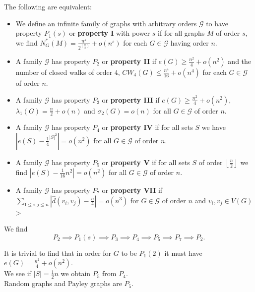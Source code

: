 \begin{definition}
	The following are equivalent:
	\begin{itemize}
		\item We define an infinite family of graphs with arbitrary orders \(\mathscr{G}\) to have property \(P_1\left( s \right) \) or  \textbf{property I} with power \(s\) if for all graphs \(M\) of order \(s\), we find \(N_{G}^{*}\left( M \right) = \frac{n^{s}}{2^{\binom{n}{2}}} + o\left( n^{s} \right) \) for each \(G \in \mathscr{G}\) having order \(n\).
		\item A family \(\mathscr{G}\) has property \(P_2\) or \textbf{property II} if \(e\left( G \right)  \ge \frac{n^2}{4} + o\left( n^2 \right) \) and the number of closed walks of order \(4\), \(CW_4 \left( G \right) \le \frac{n^{4}}{16}+ o\left( n^{4} \right) \) for each \(G \in \mathscr{G}\) of order \(n\).
		\item A family \(\mathscr{G}\) has property \(P_3\) or \textbf{property III} if \(e\left( G \right)  \ge \frac{n^2}{4} + o\left( n^2 \right) \), \(\lambda_1\left( G \right) = \frac{n}{2} + o\left( n \right) \) and \(\sigma_2\left( G \right)  = o\left( n \right) \) for all \(G \in \mathscr{G}\) of order \(n\).
		\item A family \(\mathscr{G}\) has property \(P_4\) or \textbf{property IV} if for all sets \(S\) we have \(\left| e\left( S \right) - \frac{1}{4}^{\left| S \right| ^2} \right| = o\left( n^2 \right) \) for all \(G \in \mathscr{G}\) of order \(n\).
		\item A family \(\mathscr{G}\) has property \(P_5\) or \textbf{property V} if for all sets \(S\) of order \(\left\lfloor \frac{n}{2} \right\rfloor\) we find \(\left| e\left( S \right) - \frac{1}{16}n^2 \right|  = o\left( n^2 \right) \) for all \(G \in \mathscr{G}\) of order \(n\).
		\item A family \(\mathscr{G}\) has property \(P_7\) or \textbf{property VII} if \(\sum_{1 \le i, j \le n}^{} \left| \hat{d}\left( v_{i}, v_{j} \right) - \frac{n}{4} \right| = o\left( n^3 \right) \) for \(G \in \mathscr{G}\) of order \(n\) and \(v_{i}, v_{j} \in V\left( G \right) \)>
	\end{itemize}
	We find \[
		P_2 \implies P_1\left( s \right) \implies P_3 \implies P_4 \implies P_5 \implies P_7 \implies P_2
	.\]
\end{definition}
\begin{example}
	It is trivial to find that in order for \(G\) to be \(P_1\left( 2 \right) \) it must have \(e\left( G \right)  = \frac{n^2}{4} + o\left( n^2 \right) \).\\
	We see if \(\left| S \right| =\frac{1}{2}n\) we obtain \(P_5\) from \(P_4\).\\
Random graphs and Payley graphs are \(P_5\).
\end{example}
